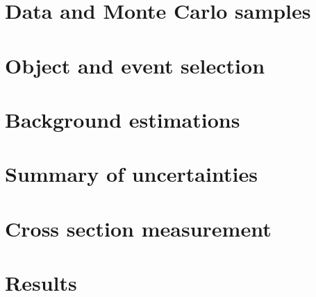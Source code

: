\section{Data and Monte Carlo samples}\label{ssww13tev:data_mc}


\section{Object and event selection}\label{ssww13tev:object_event_selection}


%

\section{Background estimations}\label{ssww13tev:background}


\section{Summary of uncertainties}\label{ssww13tev:uncertainty}

\section{Cross section measurement}\label{ssww13tev:xsec}


\section{Results}\label{ssww13tev:results}

